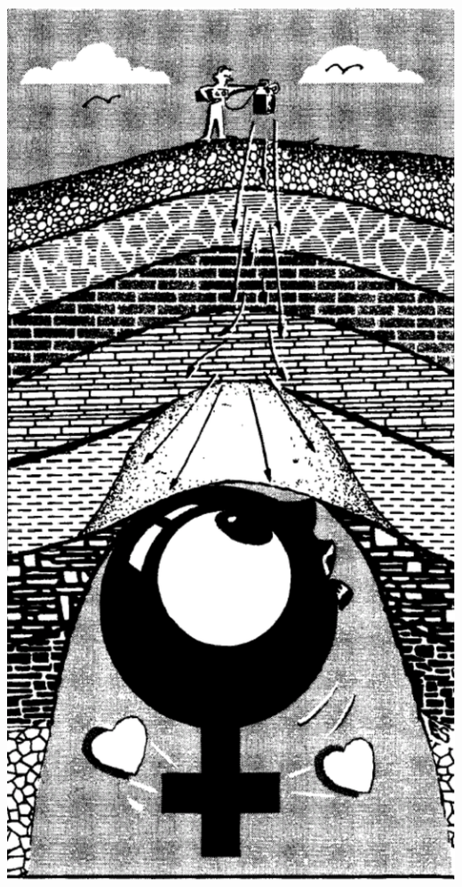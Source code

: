 \begin{frame}
\begin{minipage}{0.4\textwidth}
\end{minipage} \hfill
\begin{minipage}{0.5\textwidth}
\begin{center}
  \includegraphics[height=\textheight]{Fig/magic}
\end{center}
\end{minipage}
\end{frame}

